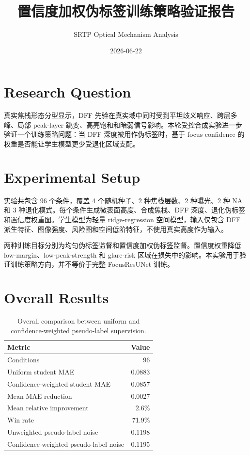 \documentclass[11pt]{article}
\title{置信度加权伪标签训练策略验证报告}
\author{SRTP Optical Mechanism Analysis}
\date{2026-06-22}
\begin{document}
\maketitle

\section{Research Question}

真实焦栈形态分型显示，DFF 先验在真实域中同时受到平坦歧义响应、跨层多峰、局部 peak-layer 跳变、高亮饱和和暗弱信号影响。本轮受控合成实验进一步验证一个训练策略问题：当 DFF 深度被用作伪标签时，基于 focus confidence 的权重是否能让学生模型更少受退化区域支配。

\section{Experimental Setup}

实验共包含 96 个条件，覆盖 4 个随机种子、2 种焦栈层数、2 种曝光、2 种 NA 和 3 种退化模式。每个条件生成微表面高度、合成焦栈、DFF 深度、退化伪标签和置信度权重图。学生模型为轻量 ridge-regression 空间模型，输入仅包含 DFF 派生特征、图像强度、风险图和空间低阶特征，不使用真实高度作为输入。

两种训练目标分别为均匀伪标签监督和置信度加权伪标签监督。置信度权重降低 low-margin、low-peak-strength 和 glare-risk 区域在损失中的影响。本实验用于验证训练策略方向，并不等价于完整 FocusResUNet 训练。

\section{Overall Results}

\begin{table}[H]
\centering
\small
\begin{tabular}{lr}
\toprule
Metric & Value \\
\midrule
Conditions & 96 \\
Uniform student MAE & 0.0883 \\
Confidence-weighted student MAE & 0.0857 \\
Mean MAE reduction & 0.0027 \\
Mean relative improvement & 2.6\% \\
Win rate & 71.9\% \\
Unweighted pseudo-label noise & 0.1198 \\
Confidence-weighted pseudo-label noise & 0.1195 \\
\bottomrule
\end{tabular}
\caption{Overall comparison between uniform and confidence-weighted pseudo-label supervision.}
\end{table}
\end{document}

